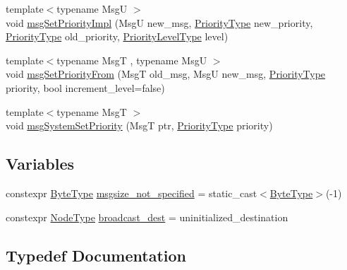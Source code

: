 \begin{DoxyCompactItemize}
\item 
{\footnotesize template$<$typename MsgU $>$ }\\void \hyperlink{namespacevt_1_1messaging_ad71afa970305de275db8e91a5041d8e9}{msg\+Set\+Priority\+Impl} (MsgU new\+\_\+msg, \hyperlink{namespacevt_a86bff9f556eb761b27fc8600d006ac04}{Priority\+Type} new\+\_\+priority, \hyperlink{namespacevt_a86bff9f556eb761b27fc8600d006ac04}{Priority\+Type} old\+\_\+priority, \hyperlink{namespacevt_a53e07fdb3351b0f263e0dfd51b968d5e}{Priority\+Level\+Type} level)
\item 
{\footnotesize template$<$typename MsgT , typename MsgU $>$ }\\void \hyperlink{namespacevt_1_1messaging_a9cbb4989b799eaba6ab9b8dde9e3cf14}{msg\+Set\+Priority\+From} (MsgT old\+\_\+msg, MsgU new\+\_\+msg, \hyperlink{namespacevt_a86bff9f556eb761b27fc8600d006ac04}{Priority\+Type} priority, bool increment\+\_\+level=false)
\item 
{\footnotesize template$<$typename MsgT $>$ }\\void \hyperlink{namespacevt_1_1messaging_ab609ea1ed68952c30bc8f9bba8d796b2}{msg\+System\+Set\+Priority} (MsgT ptr, \hyperlink{namespacevt_a86bff9f556eb761b27fc8600d006ac04}{Priority\+Type} priority)
\end{DoxyCompactItemize}
\subsection*{Variables}
\begin{DoxyCompactItemize}
\item 
constexpr \hyperlink{namespacevt_aab8d55968084610ce3b17057981e9300}{Byte\+Type} \hyperlink{namespacevt_1_1messaging_adefd943a6421b1b7120526f969bee20f}{msgsize\+\_\+not\+\_\+specified} = static\+\_\+cast$<$\hyperlink{namespacevt_aab8d55968084610ce3b17057981e9300}{Byte\+Type}$>$(-\/1)
\item 
constexpr \hyperlink{namespacevt_a866da9d0efc19c0a1ce79e9e492f47e2}{Node\+Type} \hyperlink{namespacevt_1_1messaging_a11d2b356f56486f2e60f0255cb6b05ff}{broadcast\+\_\+dest} = uninitialized\+\_\+destination
\end{DoxyCompactItemize}


\subsection{Typedef Documentation}
\mbox{\label{namespacevt_1_1messaging_a9724e719b301289eb8b3afbf9c44cf46}} 
